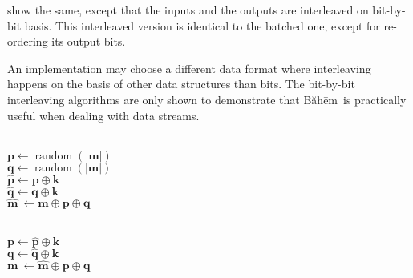 \documentclass[twocolumn,hidelinks]{article}
\newcommand{\baheem}{Băhēm}
\DeclareMathOperator{\random}{random}
\begin{document}
 show the same, except that
the inputs and the outputs are interleaved on bit-by-bit basis.  This
interleaved version is identical to the batched one, except for re-ordering
its output bits.

An implementation may choose a different data format where interleaving
happens on the basis of other data structures than bits.  The bit-by-bit
interleaving algorithms are only shown to demonstrate that \baheem\ is
practically useful when dealing with data streams.

\begin{algorithm}
    \hrulefill\\
    $\mathbf{p} \gets \random(|\mathbf{m}|)$\\
    $\mathbf{q} \gets \random(|\mathbf{m}|)$\\
    $\mathbf{\hat p} \gets \mathbf{p} \oplus \mathbf{k}$\\
    $\mathbf{\hat q} \gets \mathbf{q} \oplus \mathbf{k}$\\
    $\mathbf{\hat m} \
        \gets \mathbf{m} \oplus \mathbf{p} \oplus \mathbf{q}$\\


    \caption{Batched \baheem\ encryption}
    \label{alg_enc_batched}
\end{algorithm}

\begin{algorithm}
    \Input{$
        \mathbf{k}, \mathbf{\hat p}, \mathbf{\hat q}, \mathbf{\hat m}
    $}
    \hrulefill\\
    $\mathbf{p} \gets \mathbf{\hat p} \oplus \mathbf{k}$\\
    $\mathbf{q} \gets \mathbf{\hat q} \oplus \mathbf{k}$\\
    $\mathbf{m} \
        \gets \mathbf{\hat m} \oplus \mathbf{p} \oplus \mathbf{q}$\\

    \Return{$\mathbf{m}$}

    \caption{Batched \baheem\ decryption}
    \label{alg_dec_batched}
\end{algorithm}
\end{document}
